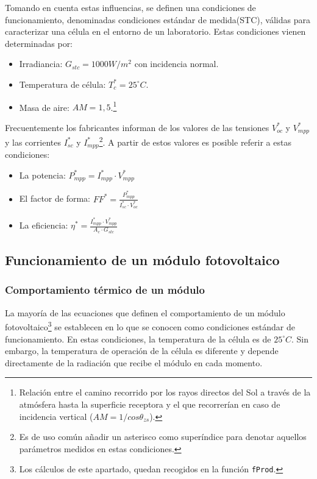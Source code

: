 Tomando en cuenta estas influencias, se definen una condiciones de funcionamiento, denominadas condiciones estándar de medida(STC), válidas para caracterizar una célula en el entorno de un laboratorio. Estas condiciones vienen determinadas por:
\begin{itemize}
\item Irradiancia: \(G_{stc}=1000W/m^2\) con incidencia normal.
\item Temperatura de célula: \(T_c^*=25^\circ C\).
\item Masa de aire: \(AM=1,5\).\footnote{Relación entre el camino recorrido por los rayos directos del Sol a través de la atmósfera hasta la superficie receptora y el que recorrerían en caso de incidencia vertical (\(AM=1/cos\theta_{zs}\)).}
\end{itemize}
Frecuentemente los fabricantes informan de los valores de las tensiones \(V_{oc}^*\) y \(V_{mpp}^*\) y las corrientes \(I_{sc}^*\) y \(I_{mpp}^*\)\footnote{Es de uso común añadir un asterisco como superíndice para denotar aquellos parámetros medidos en estas condiciones.}. A partir de estos valores es posible referir a estas condiciones:
\begin{itemize}
\item La potencia: \(P_{mpp}^*=I_{mpp}^*\cdot V_{mpp}^*\)
\item El factor de forma: \(FF^*=\frac{P_{mpp}^*}{I_{sc}^*\cdot V_{oc}^*}\)
\item La eficiencia: \(\eta^*=\frac{I_{mpp}^*\cdot V_{mpp}^*}{A_c\cdot G_{stc}}\)
\end{itemize}

\subsection{Funcionamiento de un módulo fotovoltaico}
\label{sec:orge39b360}
\label{subsec:funcionamiento-modulo-fotovoltaico}
\subsubsection{Comportamiento térmico de un módulo}
\label{sec:org873da16}
La mayoría de las ecuaciones que definen el comportamiento de un módulo fotovoltaico\footnote{Los cálculos de este apartado, quedan recogidos en la función \texttt{fProd}.} se establecen en lo que se conocen como condiciones estándar de funcionamiento. En estas condiciones, la temperatura de la célula es de \(25^\circ C\). Sin embargo, la temperatura de operación de la célula es diferente y depende directamente de la radiación que recibe el módulo en cada momento.

